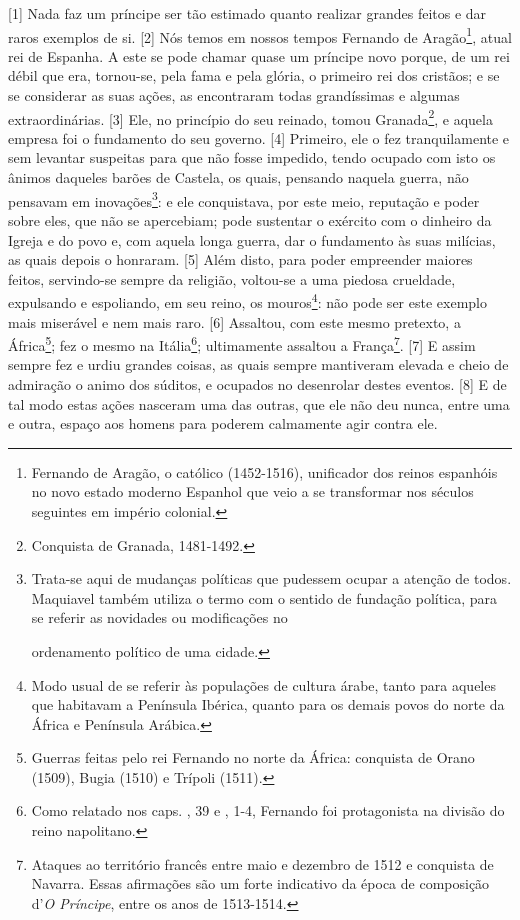 {[}1{]} Nada faz um príncipe ser tão estimado quanto realizar grandes
feitos e dar raros exemplos de si. {[}2{]} Nós temos em nossos tempos
Fernando de Aragão\footnote{Fernando de Aragão, o católico (1452-1516),
  unificador dos reinos espanhóis no novo estado moderno Espanhol que
  veio a se transformar nos séculos seguintes em império colonial.},
atual rei de Espanha. A este se pode chamar quase um príncipe novo
porque, de um rei débil que era, tornou-se, pela fama e pela glória, o
primeiro rei dos cristãos; e se se considerar as suas ações, as
encontraram todas grandíssimas e algumas extraordinárias. {[}3{]} Ele,
no princípio do seu reinado, tomou Granada\footnote{Conquista de
  Granada, 1481-1492.}, e aquela empresa foi o fundamento do seu
governo. {[}4{]} Primeiro, ele o fez tranquilamente e sem levantar
suspeitas para que não fosse impedido, tendo ocupado com isto os ânimos
daqueles barões de Castela, os quais, pensando naquela guerra, não
pensavam em inovações\footnote{Trata-se aqui de mudanças políticas que
  pudessem ocupar a atenção de todos. Maquiavel também utiliza o termo
  com o sentido de fundação política, para se referir as novidades ou
  modificações no

  ordenamento político de uma cidade.}: e ele conquistava, por este
meio, reputação e poder sobre eles, que não se apercebiam; pode
sustentar o exército com o dinheiro da Igreja e do povo e, com aquela
longa guerra, dar o fundamento às suas milícias, as quais depois o
honraram. {[}5{]} Além disto, para poder empreender maiores feitos,
servindo-se sempre da religião, voltou-se a uma piedosa crueldade,
expulsando e espoliando, em seu reino, os mouros\footnote{Modo usual de
  se referir às populações de cultura árabe, tanto para aqueles que
  habitavam a Península Ibérica, quanto para os demais povos do norte da
  África e Península Arábica.}: não pode ser este exemplo mais miserável
e nem mais raro. {[}6{]} Assaltou, com este mesmo pretexto, a
África\footnote{Guerras feitas pelo rei Fernando no norte da África:
  conquista de Orano (1509), Bugia (1510) e Trípoli (1511).}; fez o
mesmo na Itália\footnote{Como relatado nos caps. , 39 e , 1-4,
  Fernando foi protagonista na divisão do reino napolitano.};
ultimamente assaltou a França\footnote{Ataques ao território francês
  entre maio e dezembro de 1512 e conquista de Navarra. Essas afirmações
  são um forte indicativo da época de composição d'\emph{O Príncipe},
  entre os anos de 1513-1514.}. {[}7{]} E assim sempre fez e urdiu
grandes coisas, as quais sempre mantiveram elevada e cheio de admiração
o animo dos súditos, e ocupados no desenrolar destes eventos. {[}8{]} E
de tal modo estas ações nasceram uma das outras, que ele não deu nunca,
entre uma e outra, espaço aos homens para poderem calmamente agir contra
ele.

